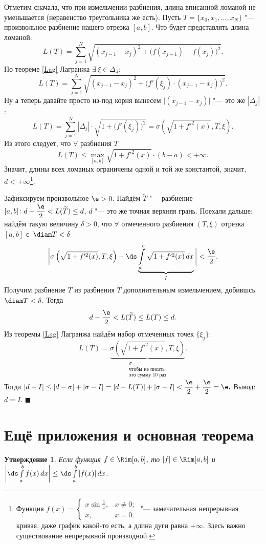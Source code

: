 \documentclass[a4paper,10pt,twoside]{article}
\newtheorem{Ut}{Утверждение}[section]
\newenvironment{Proof}
       {\par\noindent{\textbf{Доказательство.}}}
       {\hfill$\scriptstyle\blacksquare$}
\let\AVsection\section{}
\renewcommand\section{\newpage\scol\AVsection}
\newcommand{\scol}{  \renewcommand{\headrulewidth}{0.5pt}\fancyhead[RE,LO]{\thesection{} \leftmark} \fancyhead[LE,RO]{\thepage}}
\begin{document}
    \begin{Proof}
    	Отметим сначала, что при измельчении разбиения, длина вписанной ломаной не уменьшается (неравенство
    	треугольника же есть).
    	Пусть $T=\{x_0,x_1,\ldots,x_N\}$ "--- произвольное разбиение нашего отрезка $[a,b]$.
    	Что будет представлять длина ломаной:
    	$$L(T)=\sum\limits_{j=1}^N\sqrt{(x_{j-1}-x_j)^2+\big(f(x_{j-1})-f(x_j)\big)^2}.$$
    	По теореме \ref{Lag} Лагранжа $\exists\  \xi\in\Delta_J\colon$
    	$$L(T)=\sum\limits_{j=1}^N\sqrt{(x_{j-1}-x_j)^2+\big(f'(\xi_j)\cdot(x_{j-1}-x_j)\big)^2}.$$
    	Ну а теперь давайте просто из-под корня вынесем $\big|(x_{j-1}-x_j)\big|$ "--- это же $|\Delta_j|$:
    	$$L(T)=\sum\limits_{j=1}^N|\Delta_j|\cdot\sqrt{1+\big(f'(\xi_j)\big)^2}=\sigma\left(\sqrt{1+f'^2(x)},T,\xi\right).$$
    	Из этого следует, что $\forall$ разбиения $T$
    	$$L(T)\leq\max\limits_{[a,b]}\sqrt{1+f'^2(x)}\cdot(b-a)<+\infty.$$
    	Значит, длины всех ломаных ограничены одной и той же константой, значит, $d<+\infty$\footnote{Функция
    	$f(x)=\begin{cases}
    		x\sin\frac1x,&x\neq0;\\ 
    		x,&x=0.
    	\end{cases}$ "--- замечательная непрерывная кривая, даже график какой-то есть, а длина дуги равна $+\infty$.
    	Здесь важно существование непрерывной производной.}.
    	
    	Зафиксируем произвольное $\e>0$. Найдём $\widetilde T$ "--- разбиение $[a,b]\colon d-\dfrac{\e}2<L(\widetilde T)\leq d$,
    	$d$ "--- это же точная верхняя грань. Поехали дальше: найдём такую величину $\delta>0$, что 
    	$\forall$ отмеченного разбиения   $(T,\xi)$ отрезка $[a,b]$ с~$\diam T<\delta$
    	\[\bigg|\sigma\left(\sqrt{1+f'^2(x)},T,\xi\right)-\ds\underbrace{\int\limits_a^b\sqrt{1+f'^2(x)}\,dx}_{I}\bigg|<\dfrac{\e}2.\]
    	Получим  разбиение $T$ из разбиения $\widetilde T$ дополнительным измельчением, добившсь $\diam T<\delta$.
    	Тогда \[d-\dfrac{\e}2<L(\widetilde T)\leq L(T)\leq d.\]
    	Из теоремы \ref{Lag} Лагранжа найдём набор отмеченных точек $\{\xi_j\}\colon$
    	\[L(T)=\underbrace{\sigma\left(\sqrt{1+f'^2(x)},T,\xi\right)}_{\substack{\sigma\\ \text{чтобы не писать}\\ \text{это сумму 10 раз}}}.\]
    	Тогда $|d-I|\leq|d-\sigma|+|\sigma-I|=|d-L(T)|+|\sigma-I|<\dfrac{\e}2+\dfrac{\e}2=\e.$
    	Вывод: $d=I$.
    \end{Proof}
    
    \section{Ещё приложения и основная теорема}
    \begin{Ut}
    	Если функция $f\in\Rim[a,b]$, то $|f|\in\Rim[a,b]$ и $\bigg|\ds\int\limits_a^bf(x)\,dx\bigg|\leq\ds\int\limits_a^b|f(x)|\,dx$.
    \end{Ut}
    
\end{document}
